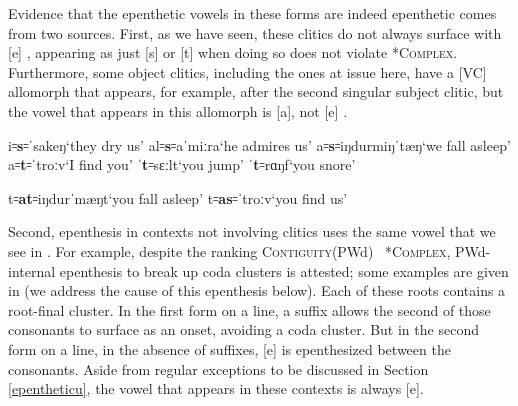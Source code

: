 \documentclass[output=paper,colorlinks,citecolor=brown]{langscibook}
\begin{document}
\hspace*{-2.5pt}Evidence that the epenthetic vowels in these forms are indeed epenthetic comes from two sources.  First, as we have seen, these clitics do not always surface with [e] , appearing as just [s] or [t] when doing so does not violate \textsc{*Complex}.  Furthermore, some object clitics, including the ones at issue here, have a [VC] allomorph that appears, for example, after the second singular subject clitic, but the vowel that appears in this allomorph is [a], not [e] .


\begin{exe}
    \ex \label{cliticsnoepenthesis} 
        \begin{xlist}
            \ex i꞊\textbf{s}꞊ˈsakeŋ\tab `they dry us'
            \ex al꞊\textbf{s}꞊aˈmiːra\tab `he admires us'
            \ex a꞊\textbf{s}꞊iŋdurmiŋˈtæŋ\tab `we fall asleep'
            \ex a꞊\textbf{t}꞊ˈtroːv\tab `I find you'
            \ex ˈ\textbf{t}꞊sɛːlt\tab `you jump'
            \ex ˈ\textbf{t}꞊rɑŋf\tab `you snore'
        \end{xlist}
\end{exe}

\begin{exe}
    \ex \label{VCallomorph}
        \begin{xlist}
            \ex t꞊\textbf{at}꞊iŋdurˈmæŋt\tab `you fall asleep'
            \ex t꞊\textbf{as}꞊ˈtroːv\tab `you find us'
        \end{xlist}
\end{exe}



Second, epenthesis in contexts not involving clitics uses the same vowel that we see in .  For example, despite the ranking \textsc{Contiguity}(PWd) \rank\ \textsc{*Complex}, PWd-internal epenthesis to break up coda clusters is attested; some examples are given in  (we address the cause of this epenthesis below).  Each of these roots contains a root-final cluster.  In the first form on a line, a suffix allows the second of those consonants to surface as an onset, avoiding a coda cluster.  But in the second form on a line, in the absence of suffixes, [e] is epenthesized between the consonants.  Aside from regular exceptions to be discussed in Section \ref{epentheticu}, the vowel that appears in these contexts is always [e].
\end{document}
